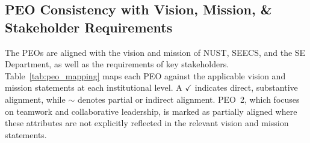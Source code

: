 \subsection{PEO Consistency with Vision, Mission, \& Stakeholder Requirements} \label{consistency-of-peos}
The PEOs are aligned with the vision and mission of NUST, SEECS, and the SE Department, as well as the requirements of key stakeholders. Table~\ref{tab:peo_mapping} maps each PEO against the applicable vision and mission statements at each institutional level. A $\checkmark$ indicates direct, substantive alignment, while $\sim$ denotes partial or indirect alignment. PEO~2, which focuses on teamwork and collaborative leadership, is marked as partially aligned where these attributes are not explicitly reflected in the relevant vision and mission statements.

